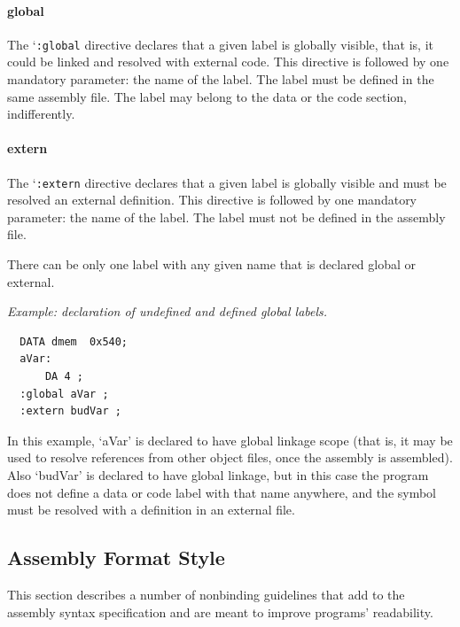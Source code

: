 \documentclass[a4paper,twoside]{tceusermanual}
\begin{document}
\paragraph{global}
The `\verb|:global| directive declares that a given label is globally
visible, that is, it could be linked and resolved with external code. This
directive is followed by one mandatory parameter: the name of the label. The
label must be defined in the same assembly file. The label may belong to the
data or the code section, indifferently.

\paragraph{extern}
The `\verb|:extern| directive declares that a given label is globally
visible and must be resolved an external definition. This directive is
followed by one mandatory parameter: the name of the label. The label must
not be defined in the assembly file.

There can be only one label with any given name that is declared global or
external.

\emph{Example: declaration of undefined and defined global labels.}
\begin{verbatim}
  DATA dmem  0x540;
  aVar:
      DA 4 ;
  :global aVar ;
  :extern budVar ;
\end{verbatim}
%
In this example, `aVar' is declared to have global linkage scope (that is,
it may be used to resolve references from other object files, once the
assembly is assembled). Also `budVar' is declared to have global linkage,
but in this case the program does not define a data or code label with that
name anywhere, and the symbol must be resolved with a definition in an
external file.

\subsection{Assembly Format Style}
\label{ssec:style}

This section describes a number of nonbinding guidelines that add to the
assembly syntax specification and are meant to improve programs'
readability.
\end{document}

